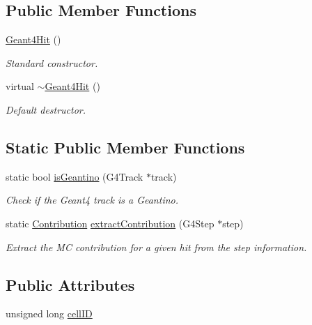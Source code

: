 \subsection*{Public Member Functions}
\begin{DoxyCompactItemize}
\item 
\hyperlink{class_d_d4hep_1_1_simulation_1_1_geant4_hit_a45eca144a88d313ce22aeaff75dedce1}{Geant4Hit} ()
\begin{DoxyCompactList}\small\item\em Standard constructor. \item\end{DoxyCompactList}\item 
virtual \hyperlink{class_d_d4hep_1_1_simulation_1_1_geant4_hit_a26ed0cb1e754012a586523a107e9bc7c}{$\sim$Geant4Hit} ()
\begin{DoxyCompactList}\small\item\em Default destructor. \item\end{DoxyCompactList}\end{DoxyCompactItemize}
\subsection*{Static Public Member Functions}
\begin{DoxyCompactItemize}
\item 
static bool \hyperlink{class_d_d4hep_1_1_simulation_1_1_geant4_hit_a4849a8685e28342d97aff6166a2f348d}{isGeantino} (G4Track $\ast$track)
\begin{DoxyCompactList}\small\item\em Check if the Geant4 track is a Geantino. \item\end{DoxyCompactList}\item 
static \hyperlink{struct_d_d4hep_1_1_simulation_1_1_geant4_hit_1_1_monte_carlo_contrib}{Contribution} \hyperlink{class_d_d4hep_1_1_simulation_1_1_geant4_hit_a9ff079cd95ab9c22abca994fcdc31d97}{extractContribution} (G4Step $\ast$step)
\begin{DoxyCompactList}\small\item\em Extract the MC contribution for a given hit from the step information. \item\end{DoxyCompactList}\end{DoxyCompactItemize}
\subsection*{Public Attributes}
\begin{DoxyCompactItemize}
\item 
unsigned long \hyperlink{class_d_d4hep_1_1_simulation_1_1_geant4_hit_a4ad2477cc6b2280300970d709190174d}{cellID}
\end{DoxyCompactItemize}


